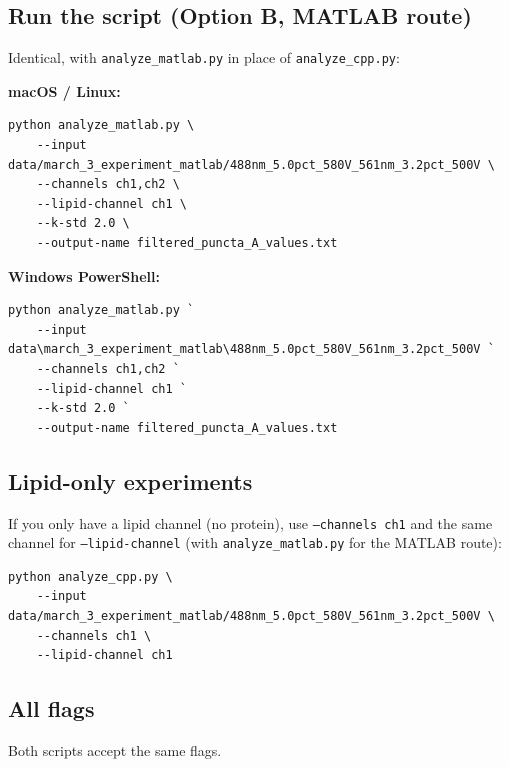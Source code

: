 \documentclass[11pt]{article}
\newcommand{\code}[1]{\texttt{#1}}
\begin{document}
\subsection*{Run the script (Option B, MATLAB route)}

Identical, with \code{analyze\_matlab.py} in place of
\code{analyze\_cpp.py}:

\textbf{macOS / Linux:}

\begin{lstlisting}
python analyze_matlab.py \
    --input data/march_3_experiment_matlab/488nm_5.0pct_580V_561nm_3.2pct_500V \
    --channels ch1,ch2 \
    --lipid-channel ch1 \
    --k-std 2.0 \
    --output-name filtered_puncta_A_values.txt
\end{lstlisting}

\textbf{Windows PowerShell:}

\begin{lstlisting}
python analyze_matlab.py `
    --input data\march_3_experiment_matlab\488nm_5.0pct_580V_561nm_3.2pct_500V `
    --channels ch1,ch2 `
    --lipid-channel ch1 `
    --k-std 2.0 `
    --output-name filtered_puncta_A_values.txt
\end{lstlisting}

\subsection*{Lipid-only experiments}

If you only have a lipid channel (no protein), use \code{--channels
ch1} and the same channel for \code{--lipid-channel} (with
\code{analyze\_matlab.py} for the MATLAB route):

\begin{lstlisting}
python analyze_cpp.py \
    --input data/march_3_experiment_matlab/488nm_5.0pct_580V_561nm_3.2pct_500V \
    --channels ch1 \
    --lipid-channel ch1
\end{lstlisting}

\subsection*{All flags}

Both scripts accept the same flags.
\end{document}
